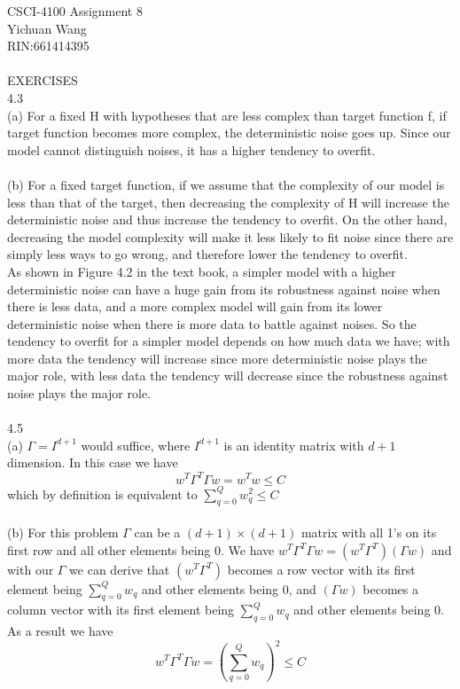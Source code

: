 \documentclass[12pt]{article}
\begin{document}
CSCI-4100 Assignment 8\\
Yichuan Wang \\
RIN:661414395\\\\
EXERCISES\\
4.3\\%
(a) For a fixed H with hypotheses that are less complex than target function f, if target function becomes more complex, the deterministic noise goes up. Since our model cannot distinguish noises, it has a higher tendency to overfit. \\\\ 
(b) For a fixed target function, if we assume that the complexity of our model is less than that of the target, then decreasing the complexity of H will increase the deterministic noise and thus increase the tendency to overfit. On the other hand, decreasing the model complexity will make it less likely to fit noise since there are simply less ways to go wrong, and therefore lower the tendency to overfit. \\
    As shown in Figure 4.2 in the text book, a simpler model with a higher deterministic noise can have a huge gain from its robustness against noise when there is less data, and a more complex model will gain from its lower deterministic noise when there is more data to battle against noises. So the tendency to overfit for a simpler model depends on how much data we have; with more data the tendency will increase since more deterministic noise plays the major role, with less data the tendency will decrease since the robustness against noise plays the major role.\\\\
4.5\\%
(a) $\Gamma=I^{d+1}$ would suffice, where $I^{d+1}$ is an identity matrix with $d+1$ dimension. In this case we have $$w^T\Gamma^T\Gamma w = w^Tw \leq C$$ which by definition is equivalent to $\sum^Q_{q=0}w_{q}^2\leq C$\\\\
(b) For this problem $\Gamma$ can be a $(d+1)\times (d+1)$ matrix with all 1's on its first row and all other elements being 0. We have $w^T\Gamma^T\Gamma w = (w^T\Gamma^T)(\Gamma w)$ and with our $\Gamma$ we can derive that $(w^T\Gamma^T)$ becomes a row vector with its first element being $\sum_{q=0}^Qw_q$ and other elements being 0, and $(\Gamma w)$ becomes a column vector with its first element being $\sum_{q=0}^Qw_q$ and other elements being 0. As a result we have $$w^T\Gamma^T\Gamma w = (\sum_{q=0}^Qw_q)^2 \leq C$$
\end{document}
